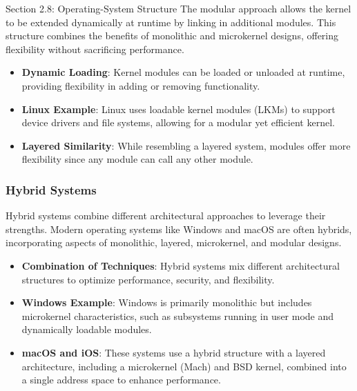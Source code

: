 \begin{notes}{Section 2.8: Operating-System Structure}
    The modular approach allows the kernel to be extended dynamically at runtime by linking in additional modules. This structure combines the benefits of monolithic and microkernel designs, 
    offering flexibility without sacrificing performance.
    
    \begin{highlight}[Modules]
    
    \begin{itemize}
        \item \textbf{Dynamic Loading}: Kernel modules can be loaded or unloaded at runtime, providing flexibility in adding or removing functionality.
        \item \textbf{Linux Example}: Linux uses loadable kernel modules (LKMs) to support device drivers and file systems, allowing for a modular yet efficient kernel.
        \item \textbf{Layered Similarity}: While resembling a layered system, modules offer more flexibility since any module can call any other module.
    \end{itemize}
    
    \end{highlight}
    
    \subsubsection*{Hybrid Systems}
    
    Hybrid systems combine different architectural approaches to leverage their strengths. Modern operating systems like Windows and macOS are often hybrids, incorporating aspects of monolithic, layered, microkernel, and modular designs.
    
    \begin{highlight}
    
    \begin{itemize}
        \item \textbf{Combination of Techniques}: Hybrid systems mix different architectural structures to optimize performance, security, and flexibility.
        \item \textbf{Windows Example}: Windows is primarily monolithic but includes microkernel characteristics, such as subsystems running in user mode and dynamically loadable modules.
        \item \textbf{macOS and iOS}: These systems use a hybrid structure with a layered architecture, including a microkernel (Mach) and BSD kernel, combined into a single address space to enhance performance.
    \end{itemize}
    

\end{highlight}
\end{notes}
